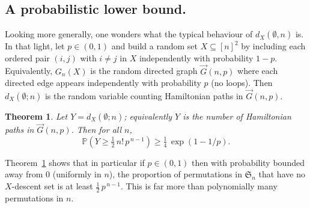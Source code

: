 \documentclass[12pt]{amsart}
\newtheorem{theorem}{Theorem}[section]
\theoremstyle{definition}
\theoremstyle{remark}
\begin{document}
\subsection{A probabilistic lower bound.}
Looking more generally, one wonders what the typical behaviour of $d_X(\emptyset,n)$ is. In that light, let $p\in(0,1)$ and build a random set $X\subseteq[n]^2$ by including each ordered pair $(i,j)$ with $i\neq j$ in
$X$ independently with probability $1-p$. Equivalently, $G_n(X)$ is the random directed graph $\vec{G}(n,p)$ where each
directed edge appears independently with probability $p$ (no loops). Then $d_X(\emptyset;n)$ is the random variable
counting Hamiltonian paths in $\vec{G}(n,p)$.

\begin{theorem}\label{thm:probabilistic}
Let $Y=d_X(\emptyset;n)$;  equivalently $Y$ is the number of
Hamiltonian paths in $\vec{G}(n,p)$.
Then for all $n$,
\[
\mathbb{P}\!\left(Y\ge \tfrac12\,n!\,p^{\,n-1}\right)\ge \tfrac14\,\exp(1-1/p).
\]
\end{theorem}
Theorem~\ref{thm:probabilistic} shows that in particular if $p \in (0,1)$ then with probability bounded away from $0$ (uniformly in $n$), the proportion of permutations in $\mathfrak{S}_n$ that have no $X$-descent set is at least
$\tfrac12\,p^{\,n-1}$. This is far more than polynomially many permutations in $n$.
\end{document}

